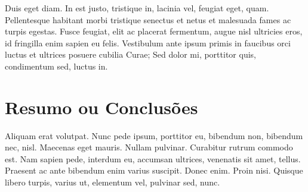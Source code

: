 Duis eget diam. In est justo, tristique in, lacinia vel, feugiat eget,
quam. Pellentesque habitant morbi tristique senectus et netus et
malesuada fames ac turpis egestas. Fusce feugiat, elit ac placerat
fermentum, augue nisl ultricies eros, id fringilla enim sapien eu
felis. Vestibulum ante ipsum primis in faucibus orci luctus et
ultrices posuere cubilia Curae; Sed dolor mi, porttitor quis,
condimentum sed, luctus in. 

\section{Resumo ou Conclusões}

Aliquam erat volutpat. Nunc pede ipsum, porttitor eu, bibendum non,
bibendum nec, nisl. Maecenas eget mauris. Nullam pulvinar. Curabitur
rutrum commodo est. Nam sapien pede, interdum eu, accumsan ultrices,
venenatis sit amet, tellus. Praesent ac ante bibendum enim varius
suscipit. Donec enim. Proin nisi. Quisque libero turpis, varius ut,
elementum vel, pulvinar sed, nunc. 
